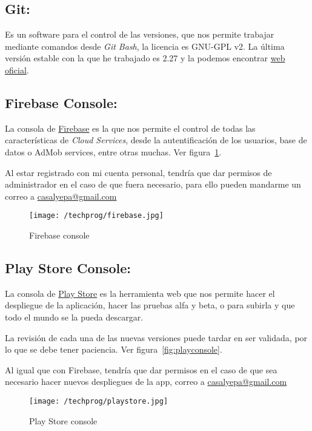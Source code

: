 \subsection{Git:}
Es un software para el control de las versiones, que nos permite trabajar mediante comandos desde \emph{Git Bash}, la licencia es GNU-GPL v2.  La última versión estable con la que he trabajado es 2.27 y la podemos encontrar \href{https://git-scm.com/}{web oficial}.

\subsection{Firebase Console:}
La consola de \href{https://console.firebase.google.com/?hl=es}{Firebase} es la que nos permite el control de todas las características de \emph{Cloud Services}, desde la autentificación de los usuarios, base de datos o AdMob services, entre otras muchas. Ver figura~\ref{fig:firebaseconsole}.

Al estar registrado con mi cuenta personal, tendría que dar permisos de administrador en el caso de que fuera necesario, para ello pueden mandarme un correo a \href{mailto:casalyepa@gmail.com}{casalyepa@gmail.com}

\begin{figure}%
	\centering
	\texttt{[image: /techprog/firebase.jpg]}
	\caption{Firebase console}
	\label{fig:firebaseconsole}
\end{figure}


\subsection{Play Store Console:}
La consola de \href{https://play.google.com/apps}{Play Store} es la herramienta web que nos permite hacer el despliegue de la aplicación, hacer las pruebas alfa y beta, o para subirla y que todo el mundo se la pueda descargar.

La revisión de cada una de las nuevas versiones puede tardar en ser validada, por lo que se debe tener paciencia. Ver figura~\ref{fig:playconsole}.

Al igual que con Firebase, tendría que dar permisos en el caso de que sea necesario hacer nuevos despliegues de la app, correo a \href{mailto:casalyepa@gmail.com}{casalyepa@gmail.com}

\begin{figure}%
	\centering
	\texttt{[image: /techprog/playstore.jpg]}
	\caption{Play Store console}
	\label{fig:palyconsole}
\end{figure}


